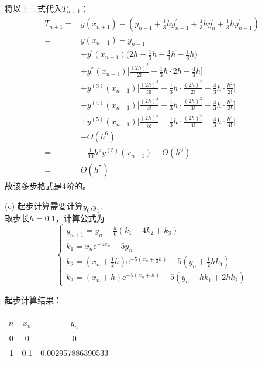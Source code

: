 \documentclass[12pt,a4paper,utf8]{ctexart}
\begin{document}
\begin{enumerate}
将以上三式代入$T_{n+1}$：
\begin{equation}
    \begin{aligned}
        T_{n+1}=&y(x_{n+1})-(y_{n-1}+\frac{1}{3}hy^{'}_{n+1}+\frac{4}{3}hy^{'}_n+\frac{1}{3}hy^{'}_{n-1})\\
        =&y(x_{n-1})-y_{n-1}\\
        &+y^{'}(x_{n-1})\Big( 2h-\frac{1}{3}h-\frac{4}{3}h-\frac{1}{3}h \Big)\\
        &+y^{''}(x_{n-1})\Big[ \frac{(2h)^2}{2!}-\frac{1}{3}h\cdot2h-\frac{4}{3}h \Big]\\
        &+y^{(3)}(x_{n-1})\Big[\frac{(2h)^3}{3!}-\frac{1}{3}h\cdot\frac{(2h)^2}{2!}-\frac{4}{3}h\cdot\frac{h^2}{2!}\Big]\\
        &+y^{(4)}(x_{n-1})\Big[\frac{(2h)^4}{4!}-\frac{1}{3}h\cdot\frac{(2h)^3}{3!}-\frac{4}{3}h\cdot\frac{h^3}{3!}\Big]\\
        &+y^{(5)}(x_{n-1})\Big[\frac{(2h)^5}{5!}-\frac{1}{3}h\cdot\frac{(2h)^4}{4!}-\frac{4}{3}h\cdot\frac{h^4}{4!}\Big]\\
        &+O(h^6)\\
        =&-\frac{1}{90}h^5y^{(5)}(x_{n-1})+O(h^6)\\
        =&O(h^5)
    \end{aligned}
\end{equation}
故该多步格式是4阶的。

\subitem(c)
起步计算需要计算$y_0$,$y_1$.\\
取步长$h=0.1$，计算公式为
\begin{equation}
    \left\{\begin{array}{l}
        y_{n+1}=y_n+\frac{h}{6}(k_1+4k_2+k_3)\\
        k_1=x_n\mathrm{e}^{-5x_n}-5y_n\\
        k_2=(x_n+\frac{1}{2}h)\mathrm{e}^{-5(x_n+\frac{1}{2}h)}-5(y_n+\frac{1}{2}hk_1)\\
        k_3=(x_n+h)\mathrm{e}^{-5(x_n+h)}-5(y_n-hk_1+2hk_2)
    \end{array}\right.
\end{equation}

起步计算结果：

\begin{center}
    \begin{tabular}{c|c|c}
        \hline
        $n$ & $x_n$ & $y_n$ \\
        \hline
        0 & 0   & 0\\
        1 & 0.1 & 0.002957886390533\\
        \hline
    \end{tabular}
\end{center}


\end{enumerate}
\end{document}
